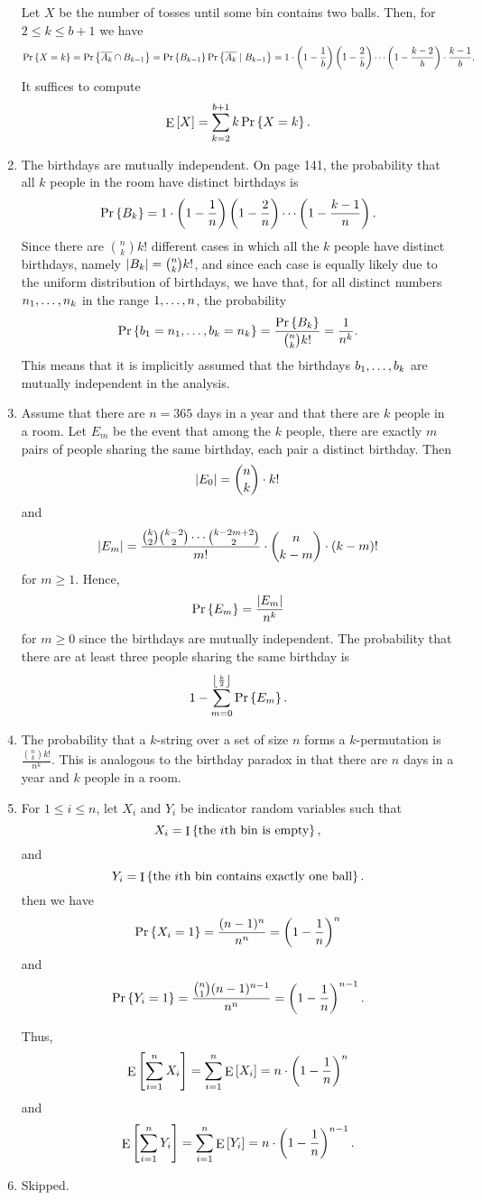 \begin{enumerate}[\thesection-1]
Let $X$ be the number of tosses until some bin contains two balls. Then, for $2 \leq k \leq b + 1$ we have
\[
\Pr\left\{X = k\right\} = \Pr\left\{\overline{A_k} \cap B_{k - 1}\right\} = \Pr\left\{B_{k - 1}\right\} \Pr\left\{\overline{A_k} \mid B_{k - 1}\right\} = 1 \cdot \left(1 - \frac{1}{b}\right) \left(1 - \frac{2}{b}\right) \cdots \left(1 - \frac{k - 2}{b}\right) \cdot \frac{k - 1}{b}.
\]
It suffices to compute
\[
\ex{X} = \sum^{b + 1}_{k = 2} k \pr{X = k}.
\]
%
\item The birthdays are mutually independent. On page 141, the probability that all $k$ people in the room have distinct birthdays is
\[
\Pr\left\{B_k\right\} = 1 \cdot \left(1 - \frac{1}{n}\right) \left(1 - \frac{2}{n}\right) \cdots \left(1 - \frac{k - 1}{n}\right).
\]
Since there are ${n \choose k} k!$ different cases in which all the $k$ people have distinct birthdays, namely $\left|B_k\right| = {n \choose k} k!$, and since each case is equally likely due to the uniform distribution of birthdays, we have that, for all distinct numbers $n_1, \ldots, n_k$ in the range $1, \ldots, n$, the probability
\[
\Pr\left\{b_1 = n_1, \ldots, b_k = n_k\right\} = \frac{\Pr\left\{B_k\right\}}{{n \choose k} k!} = \frac{1}{n^k}.
\]
This means that it is implicitly assumed that the birthdays $b_1, \ldots, b_k$ are mutually independent in the analysis.
%
\item Assume that there are $n = 365$ days in a year and that there are $k$ people in a room. Let $E_m$ be the event that among the $k$ people, there are exactly $m$ pairs of people sharing the same birthday, each pair a distinct birthday. Then
\[
\left|E_0\right| = {n \choose k} \cdot k!
\]
and
\[
\left|E_m\right| = \frac{{k \choose 2}{k - 2 \choose 2} \cdots {k - 2m + 2 \choose 2}}{m!} \cdot {n \choose k - m} \cdot (k - m)!
\]
for $m \geq 1$. Hence,
\[
\Pr\left\{E_m\right\} = \frac{\left|E_m\right|}{n^k}
\]
for $m \geq 0$ since the birthdays are mutually independent. The probability that there are at least three people sharing the same birthday is
\[
1 - \sum^{\left\lfloor \frac{k}{2} \right\rfloor}_{m = 0} \Pr\left\{E_m\right\}.
\]
%
\item The probability that a $k$-string over a set of size $n$ forms a $k$-permutation is $\frac{{n \choose k} k!}{n^k}$. This is analogous to the birthday paradox in that there are $n$ days in a year and $k$ people in a room.
%
\item For $1 \leq i \leq n$, let $X_i$ and $Y_i$ be indicator random variables such that
\[
X_i = \ind{\mbox{the \mathmode{i}th bin is empty}},
\]
and
\[
Y_i = \ind{\mbox{the \mathmode{i}th bin contains exactly one ball}}.
\]
then we have
\[
\Pr\left\{X_i = 1\right\} = \frac{(n - 1)^n}{n^n} = \left(1 - \frac{1}{n}\right)^n
\]
and
\[
\Pr\left\{Y_i = 1\right\} = \frac{{n \choose 1}(n - 1)^{n - 1}}{n^n} = \left(1 - \frac{1}{n}\right)^{n - 1}.
\]

Thus,
\[
\ex{\sum^n_{i = 1} X_i} = \sum^n_{i = 1} \ex{X_i} = n \multp \parenf{1 - \frac{1}{n}}^n
\]
and
\[
\ex{\sum^n_{i = 1} Y_i} = \sum^n_{i = 1} \ex{Y_i} = n \multp \parenf{1 - \frac{1}{n}}^{n - 1}.
\]
%
\item Skipped.
%
\end{enumerate}

